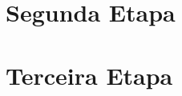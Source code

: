 \documentclass[11pt]{article}
\begin{document}
\newpage

\section*{Segunda Etapa}


\begin{figure}[H]
    
\end{figure}







\section*{Terceira Etapa}
\end{document}
